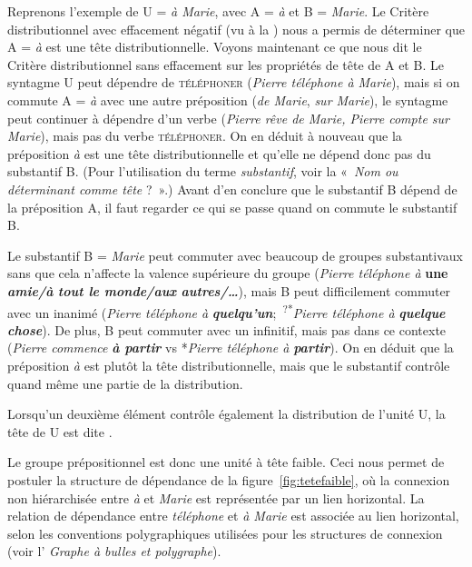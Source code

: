 Reprenons l’exemple de U = \textit{à Marie}, avec A = \textit{à} et B = \textit{Marie}. Le Critère distributionnel avec effacement négatif (vu à la ) nous a permis de déterminer que A = \textit{à} est une tête distributionnelle. Voyons maintenant ce que nous dit le Critère distributionnel sans effacement sur les propriétés de tête de A et B. Le syntagme U peut dépendre de \textsc{téléphoner} (\textit{Pierre téléphone à Marie}), mais si on commute A = \textit{à} avec une autre préposition (\textit{de Marie}, \textit{sur Marie}), le syntagme peut continuer à dépendre d’un verbe (\textit{Pierre rêve de Marie, Pierre compte sur Marie}), mais pas du verbe \textsc{téléphoner}. On en déduit à nouveau que la préposition \textit{à} est une tête distributionnelle et qu’elle ne dépend donc pas du substantif B. (Pour l’utilisation du terme \textit{substantif}, voir la  «~\textit{Nom ou déterminant comme tête} ?~».) Avant d’en conclure que le substantif B dépend de la préposition A, il faut regarder ce qui se passe quand on commute le substantif B.

Le substantif B = \textit{Marie} peut commuter avec beaucoup de groupes substantivaux sans que cela n’affecte la valence supérieure du groupe (\textit{Pierre téléphone à} \textbf{\textbf{une} \textit{amie/à} \textit{tout le monde/aux} \textit{autres/…}}), mais B peut difficilement commuter avec un inanimé (\textit{Pierre téléphone à} \textbf{\textit{quelqu’un}};~\textsuperscript{?*}\textit{Pierre téléphone à} \textbf{\textit{quelque chose}}). De plus, B peut commuter avec un infinitif, mais pas dans ce contexte (\textit{Pierre commence} \textbf{\textit{à partir}} vs *\textit{Pierre téléphone à} \textbf{\textit{partir}}). On en déduit que la préposition \textit{à} est plutôt la tête distributionnelle, mais que le substantif contrôle quand même une partie de la distribution.

{Lorsqu’un deuxième élément contrôle également la distribution de l’unité U, la tête de U est dite .}

Le groupe prépositionnel est donc une unité à tête faible. 
Ceci nous permet de postuler la structure de dépendance de la figure~\ref{fig:tetefaible}, où la connexion non hiérarchisée entre \textit{à} et \textit{Marie} est représentée par un lien horizontal. La relation de dépendance entre \textit{téléphone} et \textit{à Marie} est associée au lien horizontal, selon les conventions polygraphiques utilisées pour les structures de connexion (voir l’ \textit{Graphe à bulles et polygraphe}). 

